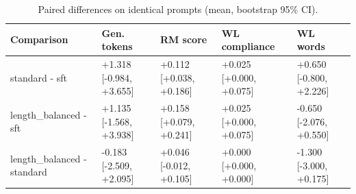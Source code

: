 \begin{table}[t]
\centering
\small
\caption{Paired differences on identical prompts (mean, bootstrap 95\% CI).}
\begin{tabular}{lllll}
\toprule
Comparison & Gen. tokens & RM score & WL compliance & WL words \\
\midrule
standard - sft & +1.318 [-0.984, +3.655] & +0.112 [+0.038, +0.186] & +0.025 [+0.000, +0.075] & +0.650 [-0.800, +2.226] \\
length\_balanced - sft & +1.135 [-1.568, +3.938] & +0.158 [+0.079, +0.241] & +0.025 [+0.000, +0.075] & -0.650 [-2.076, +0.550] \\
length\_balanced - standard & -0.183 [-2.509, +2.095] & +0.046 [-0.012, +0.105] & +0.000 [+0.000, +0.000] & -1.300 [-3.000, +0.175] \\
\bottomrule
\end{tabular}
\end{table}
